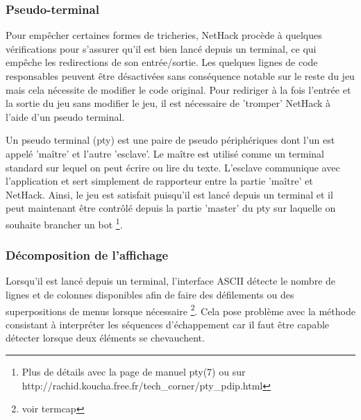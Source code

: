 \documentclass[a4paper,12pt]{article}
\begin{document}
\subsubsection*{Pseudo-terminal}

Pour empêcher certaines formes de tricheries, NetHack procède à quelques vérifications pour s'assurer qu'il est bien lancé depuis un terminal, ce qui empêche les redirections de son entrée/sortie. Les quelques lignes de code responsables peuvent être désactivées sans conséquence notable sur le reste du jeu mais cela nécessite de modifier le code original. Pour rediriger à la fois l'entrée et la sortie du jeu sans modifier le jeu, il est nécessaire de 'tromper' NetHack à l'aide d'un pseudo terminal.

Un pseudo terminal (pty) est une paire de pseudo périphériques dont l'un est appelé 'maître' et l'autre 'esclave'. Le maître est utilisé comme un terminal standard sur lequel on peut écrire ou lire du texte. L'esclave communique avec l'application et sert simplement de rapporteur entre la partie 'maître' et NetHack. Ainsi, le jeu est satisfait puisqu'il est lancé depuis un terminal et il peut maintenant être contrôlé depuis la partie 'master' du pty sur laquelle on souhaite brancher un bot \footnote{Plus de détails avec la page de manuel pty(7) ou sur http://rachid.koucha.free.fr/tech\_corner/pty\_pdip.html}.


\subsubsection*{Décomposition de l'affichage}

Lorsqu'il est lancé depuis un terminal, l'interface ASCII détecte le nombre de lignes et de colonnes disponibles afin de faire des défilements ou des superpositions de menus lorsque nécessaire \footnote{voir termcap}. Cela pose problème avec la méthode consistant à interpréter les séquences d'échappement car il faut être capable détecter lorsque deux éléments se chevauchent.
\end{document}
